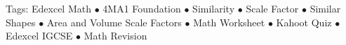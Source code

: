 \documentclass[11pt,a4paper]{article}
\begin{document}
\vspace{14pt}
\begin{center}
  \sffamily\scriptsize\textcolor{textmuted}{
    Tags: Edexcel Math $\bullet$ 4MA1 Foundation $\bullet$ Similarity $\bullet$ Scale Factor $\bullet$ Similar Shapes $\bullet$ Area and Volume Scale Factors $\bullet$ Math Worksheet $\bullet$ Kahoot Quiz $\bullet$ Edexcel IGCSE $\bullet$ Math Revision
  }
\end{center}
\end{document}
